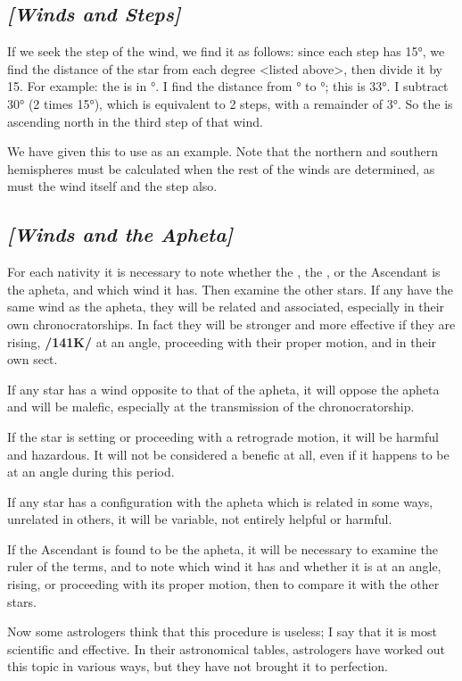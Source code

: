 \subsection{\textit{[Winds and Steps]}}
If we seek the step of the wind, we find it as follows: since each step has 15°, we find the distance of the star from each degree <listed above>, then divide it by 15. For example: the \Sun\xspace is in \Aquarius\xspace 22°. I find the distance from \Capricorn\xspace 19° to \Aquarius\xspace 22°; this is 33°. I subtract 30° (2 times 15°), which is equivalent to 2 steps, with a remainder of 3°. So the \Sun\xspace is ascending north in the third step of that wind.

We have given this to use as an example. Note that the northern and southern hemispheres must be calculated when the rest of the winds are determined, as must the wind itself and the step also.

\subsection{\textit{[Winds and the Apheta]}}
For each nativity it is necessary to note whether the \Sun, the \Moon, or the Ascendant is the apheta, and which wind it has. Then examine the other stars. If any have the same wind as the apheta, they will be related and associated, especially in their own chronocratorships. \mndl In fact they will be stronger and more effective if they are rising, \textbf{/141K/} at an angle, proceeding with their proper motion, and in their own sect.

If any star has a wind opposite to that of the apheta, it will oppose the apheta and will be malefic, especially at the transmission of the chronocratorship. 

If the star is setting or proceeding with a retrograde
motion, it will be harmful and hazardous. It will not be considered a benefic at all, even if it happens to be
at an angle during this period. 

If any star has a configuration with the apheta which is related in some ways, unrelated in others, it will be variable, not entirely helpful or harmful. 

If the Ascendant is found to be the apheta, it will be necessary to examine the ruler of the terms, and to note which wind it has and whether it is at an angle, rising, or proceeding with its proper motion, then to compare it with the other stars.

Now some astrologers think that this procedure is useless; I say that it is most scientific and effective. In their astronomical tables, astrologers have worked out this topic in various ways, but they have not brought it to perfection.

\newpage
